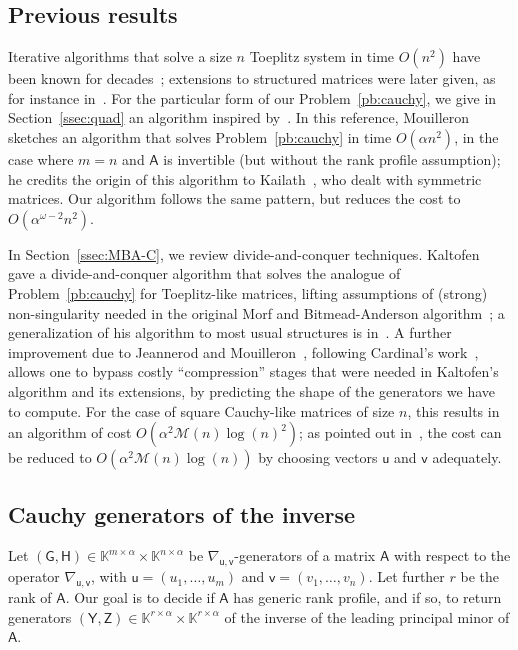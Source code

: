 \documentclass{sig-alternate}
\newcommand{\vu}{\ensuremath{\mathsf{u}}}
\newcommand{\vv}{\ensuremath{\mathsf{v}}}
\newcommand{\mA}{\ensuremath{\mathsf{A}}}
\newcommand{\mG}{\ensuremath{\mathsf{G}}}
\newcommand{\mH}{\ensuremath{\mathsf{H}}}
\newcommand{\mY}{\ensuremath{\mathsf{Y}}}
\newcommand{\mZ}{\ensuremath{\mathsf{Z}}}
\newcommand{\K}{\ensuremath{\mathbb{K}}}
\newcommand{\M}{\ensuremath{\mathscr{M}}}
\begin{document}

\subsection{Previous results}

Iterative algorithms that solve a size $n$ Toeplitz system in time
$O(n^2)$ have been known for
decades~\cite{Levinson47,Durbin60,Trench64}; extensions to
structured matrices were later given, as for instance
in~\cite{KaGoOl95}. For the particular form of our
Problem~\ref{pb:cauchy}, we give in Section~\ref{ssec:quad} an
algorithm inspired by~\cite[Algorithme~4]{Mouilleron08}. In this
reference, Mouilleron sketches an algorithm that solves
Problem~\ref{pb:cauchy} in time $O(\alpha n^2)$, in the case where
$m=n$ and $\mA$ is invertible (but without the rank profile
assumption); he credits the origin of this algorithm to
Kailath~\cite[\S1.10]{KaSa99}, who dealt with symmetric matrices.
Our algorithm follows the same pattern, but reduces the cost to 
$O(\alpha^{\omega-2} n^2)$.

In Section~\ref{ssec:MBA-C}, we review divide-and-conquer
techniques. Kaltofen~\cite{Kaltofen94} gave a divide-and-conquer
algorithm that solves the analogue of Problem~\ref{pb:cauchy} for
Toeplitz-like matrices, lifting assumptions of (strong)
non-singularity needed in the original Morf and Bitmead-Anderson
algorithm~\cite{Morf80,BiAn80}; a generalization of his algorithm to
most usual structures is in~\cite{Pan01}.  A further improvement due
to Jeannerod and Mouilleron~\cite{JeMo10}, following Cardinal's
work~\cite{Cardinal99}, allows one to bypass costly ``compression''
stages that were needed in Kaltofen's algorithm and its extensions, by
predicting the shape of the generators we have to compute. For the
case of square Cauchy-like matrices of size $n$, this results in an
algorithm of cost $O(\alpha^2 \M(n)\log(n)^2)$; as pointed out
in~\cite{xxx}, the cost can be reduced to $O(\alpha^2 \M(n)\log(n))$
by choosing vectors $\vu$ and $\vv$ adequately.



\subsection{Cauchy generators of the inverse}\label{ssec:genofinv}

Let $(\mG,\mH) \in \K^{m\times \alpha} \times \K^{n\times \alpha}$ be
$\nabla_{\vu,\vv}$-generators of a matrix $\mA$ with respect to the
operator $\nabla_{\vu,\vv}$, with $\vu=(u_1,\dots,u_m)$ and
$\vv=(v_1,\dots,v_n)$. Let further $r$ be the rank of $\mA$. Our goal
is to decide if $\mA$ has generic rank profile, and if so, to return
generators $(\mY,\mZ) \in \K^{r\times \alpha} \times \K^{r\times
  \alpha}$ of the inverse of the leading principal minor of $\mA$.
\end{document}
